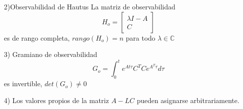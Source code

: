 2)Observabilidad de Hautus
La matriz de observabilidad
\[
    H_{o} =
    \begin{bmatrix}
        \lambda I-A \\ C
    \end{bmatrix}
\]
es de rango completa, \( rango(H_{o})=n \) para todo \( \lambda \in \mathbb{C} \)

3) Gramiano de observabilidad
\[
    G_{o} = \int_{0}^{t} e^{At\tau}C^{T}Ce^{A^{T}\tau}d\tau
\]
es invertible, \( det(G_{o}) \not= 0 \)

4) Los valores propios de la matriz \( A-LC \) pueden asignarse arbitrariamente.